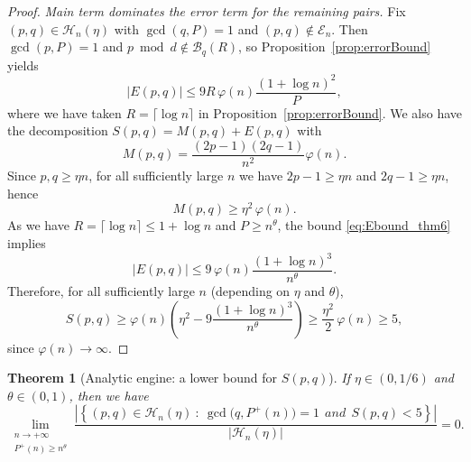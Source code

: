 \documentclass[12pt]{amsart}
\newtheorem{theorem}{Theorem}[section]
\begin{document}
\begin{proof}
\smallskip\noindent
\emph{Main term dominates the error term for the remaining pairs.}
Fix $(p,q)\in\mathcal H_n(\eta)$ with $\gcd(q,P)=1$ and $(p,q)\notin\mathcal E_n$.
Then $\gcd(p,P)=1$ and $p\bmod d\notin\mathcal B_q(R)$, so Proposition~\ref{prop:errorBound} yields
\begin{equation}\label{eq:Ebound_thm6}
|E(p,q)| \le 9R\,\varphi(n)\frac{(1+\log n)^2}{P},
\end{equation}
where we have taken
$R=\lceil\log n\rceil$ in Proposition~\ref{prop:errorBound}.
We also have the decomposition $S(p,q)=M(p,q)+E(p,q)$ with
\[
M(p,q)=\frac{(2p-1)(2q-1)}{n^2}\varphi(n).
\]
Since $p,q\ge \eta n$, for all sufficiently large $n$ we have $2p-1\ge \eta n$ and $2q-1\ge \eta n$, hence
\[
M(p,q)\ge \eta^2\,\varphi(n).
\]
As we have $R=\lceil\log n\rceil\le 1+\log n$ and $P\ge n^\theta$, the bound \eqref{eq:Ebound_thm6} implies
\begin{equation}\label{eq:nice}
|E(p,q)|\le 9\,\varphi(n)\frac{(1+\log n)^3}{n^\theta}.
\end{equation}
Therefore, for all sufficiently large $n$ (depending on $\eta$ and $\theta$),
\[
S(p,q)\ge \varphi(n)\left(\eta^2-9\frac{(1+\log n)^3}{n^\theta}\right)\ge \frac{\eta^2}{2}\,\varphi(n)\ge 5,
\]
since $\varphi(n)\to\infty$.
\end{proof}

\begin{theorem}[Analytic engine: a lower bound for $S(p,q)$]\label{thm:engine}
If $\eta\in(0,1/6)$ and $\theta\in(0,1)$, then we have
$$
\lim_{\substack{n\rightarrow +\infty\\
P^+(n)\geq n^{\theta}}} \frac{|\left \{ (p,q) \in \mathcal{H}_n(\eta) \ : \ \gcd\!\big(q,P^+(n)\big)=1  \ \ and \ \ S(p,q)<5\right\}|}{|\mathcal{H}_n(\eta)|}=0.
$$
\end{theorem}
\end{document}
